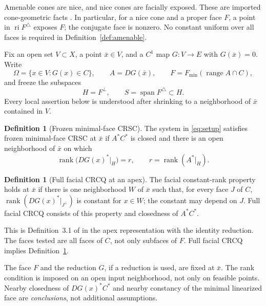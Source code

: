 \documentclass[11pt]{article}
\numberwithin{equation}{section}
\theoremstyle{definition}
\newtheorem{definition}[theorem]{Definition}
\theoremstyle{remark}
\DeclareMathOperator{\ri}{ri}
\DeclareMathOperator{\spann}{span}
\DeclareMathOperator{\range}{range}
\DeclareMathOperator{\rank}{rank}
\newcommand{\xb}{\bar x}
\begin{document}
Amenable cones are nice, and nice cones are facially exposed. These are
imported cone-geometric facts \citep{lourencoAmenable,lrs2022}. In
particular, for a nice cone and a proper face $F$, a point in
$\ri F^\triangle$ exposes $F$; the conjugate face is nonzero. No
constant uniform over all faces is required in
Definition~\ref{def:amenable}.

Fix an open set $V\subset X$, a point $\xb\in V$, and a $C^1$ map
$G:V\to E$ with $G(\xb)=0$. Write
\begin{equation}
 \Omega=\{x\in V:G(x)\in C\},\qquad A=DG(\xb),\qquad
 F=F_{\min}(\range A\cap C),
 \label{eq:setup}
\end{equation}
and freeze the subspaces
\begin{equation}
 H=F^\perp,\qquad S=\spann F^\triangle\subset H.
 \label{eq:subspaces}
\end{equation}
Every local assertion below is understood after shrinking to a
neighborhood of $\xb$ contained in $V$.

\begin{definition}[Frozen minimal-face CRSC]
\label{def:crsc}
The system in \eqref{eq:setup} satisfies frozen minimal-face CRSC at
$\xb$ if $A^*C^*$ is closed and there is an open neighborhood of $\xb$
on which
\begin{equation}
 \rank\bigl(DG(x)^*|_H\bigr)=r,
 \qquad r=\rank(A^*|_H).
 \label{eq:crsc}
\end{equation}
\end{definition}

\begin{definition}[Full facial CRCQ at an apex]
\label{def:crcq}
The facial constant-rank property holds at $\xb$ if there is one
neighborhood $W$ of $\xb$ such that, for every face $J$ of $C$,
$\rank(DG(x)^*|_{J^\perp})$ is constant for $x\in W$; the constant
may depend on $J$. Full facial CRCQ consists of this property and
closedness of $A^*C^*$.
\end{definition}
This is Definition~3.1 of \citet{ahmr2025author} in the apex
representation with the identity reduction. The faces tested are all
faces of $C$, not only subfaces of $F$. Full facial CRCQ implies
Definition~\ref{def:crsc}.

The face $F$ and the reduction $G$, if a reduction is used, are fixed at
$\xb$. The rank condition is imposed on an open input neighborhood, not
only on feasible points. Nearby closedness of $DG(x)^*C^*$ and nearby
constancy of the minimal linearized face are \emph{conclusions}, not
additional assumptions.
\end{document}
